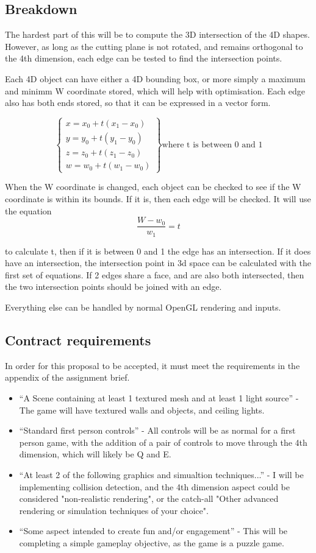 \documentclass[12pt]{article}
\begin{document}
\subsection{Breakdown}
The hardest part of this will be to compute the 3D intersection of the 4D shapes.
However, as long as the cutting plane is not rotated, and remains orthogonal to the 4th dimension, each edge can be tested to find the intersection points.

Each 4D object can have either a 4D bounding box, or more simply a maximum and minimm W coordinate stored, which will help with optimisation.
Each edge also has both ends stored, so that it can be expressed in a vector form.

\[
   \begin{Bmatrix} 
      x = x_0 + t (x_1 - x_0) \\ 
      y = y_0 + t (y_1 - y_0) \\ 
      z = z_0 + t (z_1 - z_0) \\
      w = w_0 + t (w_1 - w_0)
   \end{Bmatrix}
   \textrm{where t is between 0 and 1}
\]

When the W coordinate is changed, each object can be checked to see if the W coordinate is within its bounds. If it is, then each edge will be checked.
It will use the equation
\[
  \dfrac{W-w_0}{w_1} = t  
\]

to calculate t, then if it is between 0 and 1 the edge has an intersection.
If it does have an intersection, the intersection point in 3d space can be calculated with the first set of equations.
If 2 edges share a face, and are also both intersected, then the two intersection points should be joined with an edge.


Everything else can be handled by normal OpenGL rendering and inputs.

\subsection{Contract requirements}
In order for this proposal to be accepted, it must meet the requirements in the appendix of the assignment brief.
\begin{itemize}
    \item ``A Scene containing at least 1 textured mesh and at least 1 light source'' - The game will have textured walls and objects, and ceiling lights.
    \item ``Standard first person controls'' - All controls will be as normal for a first person game, with the addition of a pair of controls to move through the 4th dimension, which will likely be Q and E.
    \item ``At least 2 of the following graphics and simualtion techniques...'' - I will be implementing collision detection, and the 4th dimension aspect could be considered "non-realistic rendering", or the catch-all "Other advanced rendering or simulation techniques of your choice".
    \item ``Some aspect intended to create fun and/or engagement'' - This will be completing a simple gameplay objective, as the game is a puzzle game.
\end{itemize}
\end{document}
